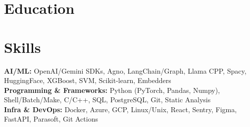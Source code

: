 \documentclass{../templates/simplecv}
\begin{document}
\section{Education}
\resumeItemListStart
{}
\resumeItemListEnd

\vspace{2pt}

\section{Skills}
\vspace{2pt}
\resumeSubHeadingListStart
\small{\item{
\textbf{AI/ML: }{OpenAI/Gemini SDKs, Agno, LangChain/Graph, Llama CPP, Spacy, HuggingFace, XGBoost, SVM, Scikit-learn, Embedders} \\ \vspace{1pt}
\textbf{Programming \& Frameworks: }{Python (PyTorch, Pandas, Numpy), Shell/Batch/Make, C/C++, SQL, PostgreSQL, Git, Static Analysis} \\ \vspace{1pt}
\textbf{Infra \& DevOps: }{Docker, Azure, GCP, Linux/Unix, React, Sentry, Figma, FastAPI, Parasoft, Git Actions} \\ \vspace{1pt}
}}
\resumeSubHeadingListEnd
\end{document}
